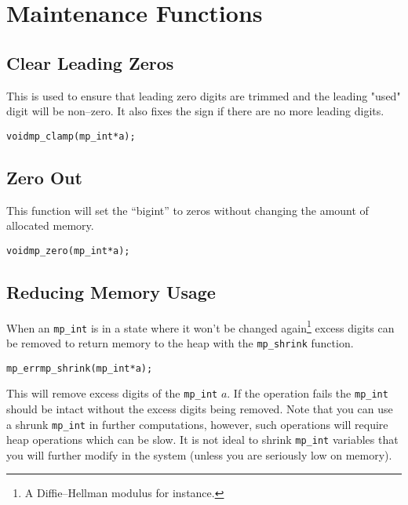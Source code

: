 \documentclass[synpaper]{book}
\begin{document}
\section{Maintenance Functions}
\subsection{Clear Leading Zeros}

This is used to ensure that leading zero digits are trimmed and the leading "used" digit will be
non--zero. It also fixes the sign if there are no more leading digits.

\begin{alltt}
void mp_clamp(mp_int *a);
\end{alltt}

\subsection{Zero Out}

This function will set the ``bigint'' to zeros without changing the amount of allocated memory.

\begin{alltt}
void mp_zero(mp_int *a);
\end{alltt}

\subsection{Reducing Memory Usage}
When an \texttt{mp\_int} is in a state where it won't be changed again\footnote{A Diffie--Hellman
  modulus for instance.} excess digits can be removed to return memory to the heap with the
\texttt{mp\_shrink} function.

\begin{alltt}
mp_err mp_shrink (mp_int *a);
\end{alltt}

This will remove excess digits of the \texttt{mp\_int} $a$.  If the operation fails the
\texttt{mp\_int} should be intact without the excess digits being removed.  Note that you can use a
shrunk \texttt{mp\_int} in further computations, however, such operations will require heap
operations which can be slow.  It is not ideal to shrink \texttt{mp\_int} variables that you will
further modify in the system (unless you are seriously low on memory).
\end{document}
